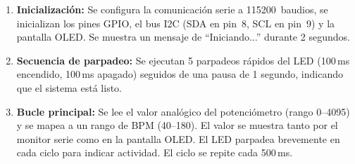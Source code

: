 \documentclass[11pt,a4paper]{article}
\begin{document}
\begin{enumerate}
    \item \textbf{Inicialización:} Se configura la comunicación serie a 115200~baudios, se inicializan los pines GPIO, el bus I2C (SDA en pin~8, SCL en pin~9) y la pantalla OLED. Se muestra un mensaje de ``Iniciando...'' durante 2 segundos.
    \item \textbf{Secuencia de parpadeo:} Se ejecutan 5 parpadeos rápidos del LED (100\,ms encendido, 100\,ms apagado) seguidos de una pausa de 1 segundo, indicando que el sistema está listo.
    \item \textbf{Bucle principal:} Se lee el valor analógico del potenciómetro (rango 0--4095) y se mapea a un rango de BPM (40--180). El valor se muestra tanto por el monitor serie como en la pantalla OLED. El LED parpadea brevemente en cada ciclo para indicar actividad. El ciclo se repite cada 500\,ms.
\end{enumerate}
\end{document}

